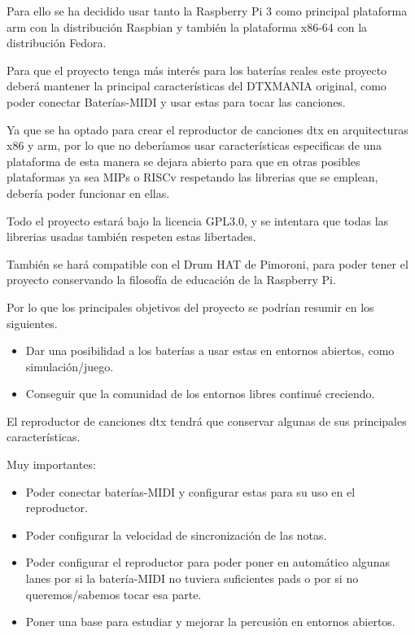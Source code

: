 \documentclass[a4paper,11pt,oneside]{book}
\begin{document}
Para ello se ha decidido usar tanto la Raspberry Pi 3 como principal plataforma arm con la distribución Raspbian y también la plataforma x86-64 con la distribución Fedora.

Para que el proyecto tenga más interés para los baterías reales este proyecto deberá mantener  la principal características del DTXMANIA original, como poder conectar Baterías-MIDI y usar estas para tocar las canciones.

Ya que se ha optado para crear el reproductor de canciones dtx en arquitecturas x86 y arm, por lo que no deberíamos usar características especificas de una plataforma de esta manera se dejara abierto para que en otras posibles plataformas ya sea MIPs o RISCv respetando las librerias que se emplean, debería poder funcionar en ellas. 

Todo el proyecto estará bajo la licencia GPL3.0, y se intentara que todas las librerias usadas también respeten estas libertades.

También se hará compatible con el Drum HAT de Pimoroni, para poder tener el proyecto conservando la filosofía de educación de la Raspberry Pi.

Por lo que los principales objetivos del proyecto se podrían resumir en los siguientes.
\begin{itemize}
\item Dar una posibilidad a los baterías a usar estas en entornos abiertos, como simulación/juego.
\item Conseguir que la comunidad de los entornos libres continué creciendo.
\end{itemize}

El reproductor de canciones dtx tendrá que conservar algunas de sus principales características.

Muy importantes:
\begin{itemize}
  \item Poder conectar baterías-MIDI y configurar estas para su uso en el reproductor.
  \item Poder configurar la velocidad de sincronización de las notas.
  \item Poder configurar el reproductor para poder poner en automático algunas lanes por si la batería-MIDI no tuviera suficientes pads o por si no queremos/sabemos tocar esa parte.
  \item Poner una base para estudiar y mejorar la percusión en entornos abiertos.
\end{itemize}
\end{document}
